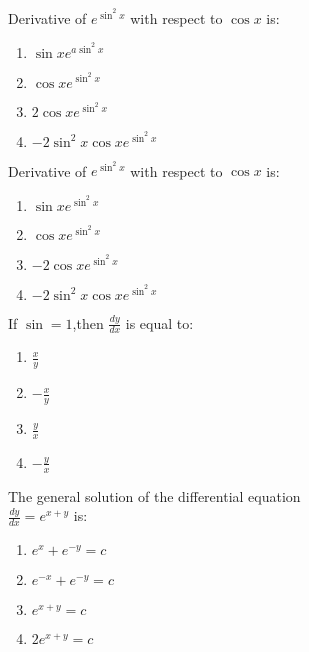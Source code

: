 \item Derivative of $e^{\sin^2{x}}$ with respect to $\cos{x}$ is:
\begin{enumerate}[label=(\alph*)]
    \item $\sin{x} e^{a\sin^2{x}}$
    \item ${\cos{x}e^{\sin^2{x}}}$
    \item $2{\cos{x}e^{\sin^2{x}}}$
    \item $-2\sin^2{x}\cos{x}e^{\sin^2{x}}$
\end{enumerate}




\item Derivative of $e^{\sin^2x}$ with respect to $ \cos{x}$ is:                      
\begin{enumerate}                             
\item $\sin{x}e^{\sin^2x}$                                             
 \item $\cos{x}e^{\sin^2x}$                                              
\item $-2{\cos{x}e^{\sin^2x}}$                                          
\item $-2{\sin^2{x}\cos{x}e^{\sin^2x}}$                                 
\end{enumerate}                                                        

\item   If $\sin $$=1$,then $\frac{dy}{dx}$ is equal to:                     
\begin{enumerate}
 \item $\frac{x}{y}$                                                     
\item $-\frac{x}{y}$                                                    
\item $\frac{y}{x}$                                                     
\item $-\frac{y}{x}$                                                    
\end{enumerate}               
                                               
 \item The general solution of the differential equation \\ $\frac{dy}{dx}=e^{x+y}$ is:                                                     
\begin{enumerate}                                           
\item $e^x+e^{-y}={c}$                                                  
\item ${e^{-x}+e^{-y}}={c}$                                             
\item $e^{x+y}={c}$                                                     
\item $2e^{x+y}={c}$                                            
\end{enumerate}



